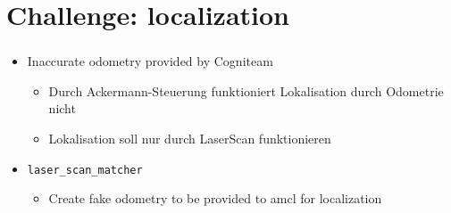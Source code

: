\documentclass[numberofslides]{AMSBeamer}
\begin{document}
\section{Challenge: localization}
\begin{frame}[label=agenda]
	\frametitle{\insertsectionhead}%
     \begin{itemize}
        \item Inaccurate odometry provided by Cogniteam
        \begin{itemize}
            \item Durch Ackermann-Steuerung funktioniert Lokalisation durch Odometrie nicht
            \item Lokalisation soll nur durch LaserScan funktionieren
        \end{itemize}
        \item \texttt{laser\_scan\_matcher}
        \begin{itemize}
            \item Create fake odometry to be provided to amcl for localization
        \end{itemize}
     \end{itemize}
\end{frame}


\end{document}
